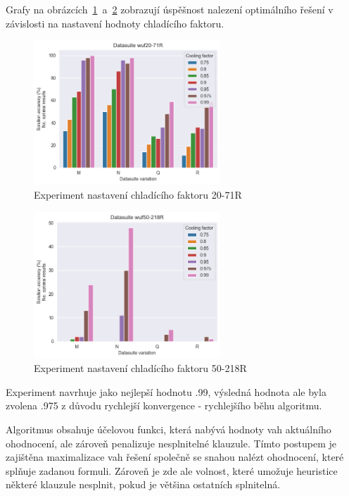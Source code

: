 \documentclass[twoside,twocolumn]{article}
\begin{document}
    Grafy na obrázcích~\ref{fig:cooling_factor_71}~a~\ref{fig:cooling_factor_218R} zobrazují úspěšnost nalezení
    optimálního řešení v závislosti na nastavení hodnoty chladícího faktoru.

    \begin{figure}
        \centering
        \includegraphics[width=7cm]{images/testing/cooling_factor/wuf20-71R}
        \caption{Experiment nastavení chladícího faktoru 20-71R}
        \label{fig:cooling_factor_71}
    \end{figure}

    \begin{figure}
        \centering
        \includegraphics[width=7cm]{images/testing/cooling_factor/wuf50-218R}
        \caption{Experiment nastavení chladícího faktoru 50-218R}
        \label{fig:cooling_factor_218R}
    \end{figure}

    Experiment navrhuje jako nejlepší hodnotu .99, výsledná hodnota ale byla zvolena .975 z důvodu rychlejší konvergence - rychlejšího běhu algoritmu.

    Algoritmus obsahuje účelovou funkci, která nabývá hodnoty vah aktuálního ohodnocení, ale zároveň penalizuje nesplnitelné klauzule.
    Tímto postupem je zajištěna maximalizace vah řešení společně se snahou nalézt ohodnocení, které splňuje zadanou formuli.
    Zároveň je zde ale volnost, které umožuje heuristice některé klauzule nesplnit, pokud je většina ostatních splnitelná.
\end{document}
